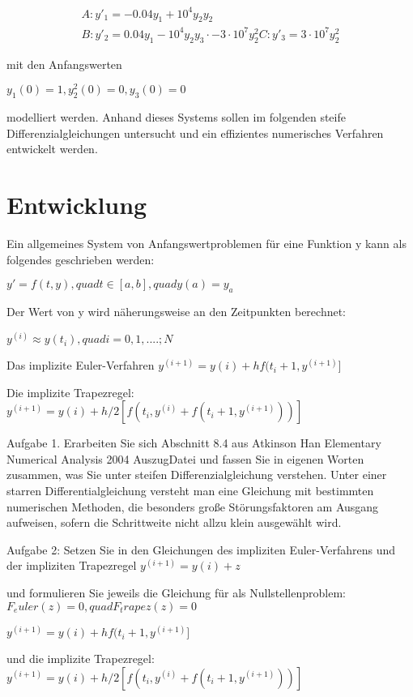 \begin{align*}
	A: y'_1 = -0.04y_1 + 10^4y_2y_2\\
	B: y'_2 =  0.04y_1 - 10^4y_2y_3\cdot - 3\cdot 10^7y^2_2
	C: y'_3 =                              3\cdot 10^7y^2_2
\end{align*}

mit den Anfangswerten

$ y_1(0) = 1, y^2_2(0) = 0, y_3(0) = 0 $

modelliert werden. Anhand dieses Systems sollen im folgenden steife Differenzialgleichungen untersucht
und ein effizientes numerisches Verfahren entwickelt werden.

\section{Entwicklung}

Ein allgemeines System von Anfangswertproblemen für eine Funktion y kann als folgendes geschrieben werden:

$ y' = f(t,y) ,quad t \in [a,b],quad y(a) = y_a $


Der Wert von y wird näherungsweise an den Zeitpunkten berechnet:

$ y^(i) \approx y(t_i),quad i = 0,1,....;N $

Das implizite Euler-Verfahren
$ y^(i+1) = y(i) + hf(t_i+1,y^(i+1)] $

Die implizite Trapezregel:
$ y^(i+1) = y(i) + h/2[f(t_i, y^(i) + f(t_i+1,y^(i+1)))] $



Aufgabe 1.
Erarbeiten Sie sich Abschnitt 8.4 aus Atkinson Han Elementary Numerical Analysis 2004 AuszugDatei und fassen Sie in eigenen Worten zusammen, was Sie unter steifen Differenzialgleichung verstehen.
Unter einer starren Differentialgleichung versteht man eine Gleichung mit bestimmten numerischen Methoden, die besonders große Störungsfaktoren am Ausgang aufweisen, sofern die Schrittweite nicht allzu klein ausgewählt wird.



Aufgabe 2:
Setzen Sie in den Gleichungen des impliziten Euler-Verfahrens und der impliziten Trapezregel
$ y^(i+1) = y(i) + z $

und formulieren Sie jeweils die Gleichung für  als Nullstellenproblem:
$ F_euler(z) = 0,quad F_trapez(z) = 0 $

$ y^(i+1) = y(i) + hf(t_i+1,y^(i+1)] $

und die implizite Trapezregel:
$ y^(i+1) = y(i) + h/2[f(t_i, y^(i) + f(t_i+1,y^(i+1)))] $

